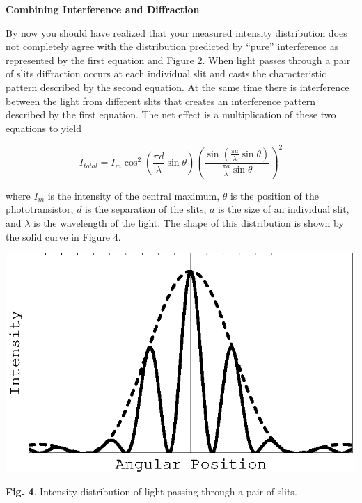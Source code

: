 \textbf{Combining Interference and Diffraction}

By now you should have realized that your measured intensity distribution
does not completely agree with the distribution predicted by {}``pure''
interference as represented by the first equation and Figure 2. When
light passes through a pair of slits diffraction occurs at each individual
slit and casts the characteristic pattern described by the second
equation. At the same time there is interference between the light
from different slits that creates an interference pattern described
by the first equation. The net effect is a multiplication of these
two equations to yield 

\begin{displaymath} I_{total} = I_m \cos^2 (\frac {\pi d} {\lambda} \sin \theta ) (\frac {\sin (\frac {\pi a} {\lambda} \sin \theta)} {\frac {\pi a} {\lambda} \sin \theta} )^2 \end{displaymath}

where $I_{m}$ is the intensity of the central maximum, \( \theta  \)
is the position of the phototransistor, $d$ is the separation of the
slits, $a$ is the size of an individual slit, and \( \lambda  \) is
the wavelength of the light. The shape of this distribution is shown
by the solid curve in Figure 4.

\vspace{0.3cm}
{\centering \includegraphics{diffraction_of_light_fig_4.eps} \par}
\vspace{0.3cm}

{\centering \textbf{Fig. 4}. Intensity distribution of light passing
through a pair of slits.\par}

